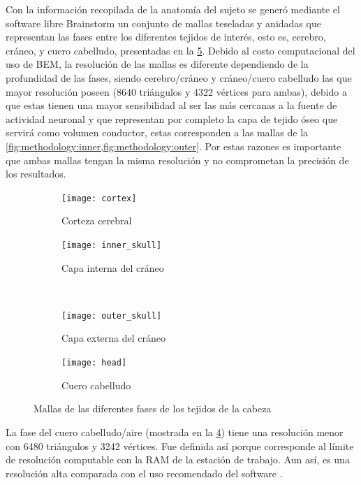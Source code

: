 Con la información recopilada de la anatomía del sujeto se generó mediante el software libre Brainstorm \cite{brain2011} un conjunto de mallas teseladas y anidadas que representan las fases entre los diferentes tejidos de interés, esto es, cerebro, cráneo, y cuero cabelludo, presentadas en la \cref{fig:methodology:meshes}.
Debido al costo computacional del uso de BEM, la resolución de las mallas es diferente dependiendo de la profundidad de las fases, siendo cerebro/cráneo y cráneo/cuero cabelludo las que mayor resolución poseen (8640 triángulos y 4322 vértices para ambas), debido a que estas tienen una mayor sensibilidad al ser las más cercanas a la fuente de actividad neuronal y que representan por completo la capa de tejido óseo que servirá como volumen conductor, estas corresponden a las mallas de la \cref{fig:methodology:inner,fig:methodology:outer}.
Por estas razones es importante que ambas mallas tengan la misma resolución y no comprometan la precisión de los resultados. 

\begin{figure}[tbp]
	\centering
	\begin{subfigure}{0.45\textwidth}
		\texttt{[image: cortex]}
		\caption{Corteza cerebral}
		\label{fig:methodology:cortex}
		\vspace{0.1cm}
	\end{subfigure}\hfill
	\begin{subfigure}{0.45\textwidth}
		\texttt{[image: inner\_skull]}
		\caption{Capa interna del cráneo}
		\label{fig:methodology:inner}
		\vspace{0.1cm}
	\end{subfigure}\\
	\begin{subfigure}{0.45\textwidth}
		\texttt{[image: outer\_skull]}
		\caption{Capa externa del cráneo}
		\label{fig:methodology:outer}
	\end{subfigure}\hfill
	\begin{subfigure}{0.45\textwidth}
		\texttt{[image: head]}
		\caption{Cuero cabelludo}
		\label{fig:methodology:head}
	\end{subfigure}
	\caption{Mallas de las diferentes fases de los tejidos de la cabeza}
	\label{fig:methodology:meshes}
\end{figure}

La fase del cuero cabelludo/aire (mostrada en la \cref{fig:methodology:head}) tiene una resolución menor con 6480 triángulos y 3242 vértices.
Fue definida así porque corresponde al límite de resolución computable con la RAM de la estación de trabajo.
Aun así, es una resolución alta comparada con el uso recomendado del software \cite{tadelMEGEEGGroup2019a}.

